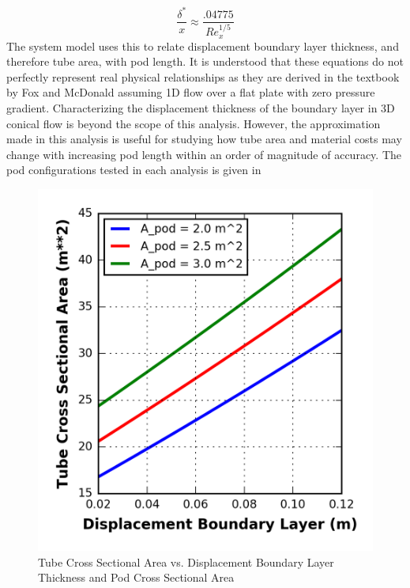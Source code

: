 \begin{equation}
	\label{eq:boundary_layer}
	\frac{\delta^{*}}{x} \approx  \frac{.04775}{Re_{x}^{1/5}}
\end{equation}
The system model uses this to relate displacement boundary layer thickness,
and therefore tube area, with pod length. It is understood that these equations
do not perfectly represent real physical relationships as they are derived in the
textbook by Fox and McDonald assuming 1D flow over a
flat plate with zero pressure gradient. Characterizing the displacement
thickness of the boundary layer in 3D conical flow is beyond the scope of this analysis.
However, the approximation made in this analysis is useful for studying how
tube area and material costs may change with increasing pod length within an
order of magnitude of accuracy.  The pod configurations tested in each analysis is given in
\begin{figure}
	\centering
	\caption{Tube Cross Sectional Area vs. Displacement Boundary Layer Thickness and Pod Cross Sectional Area}
	\label{fig:cross_sec_area_vs_disp_boundary_layer}
	\includegraphics{../../images/graphs/boundary_layer_growth_trades/Tube_Area_vs_boundary_layer.png}
\end{figure}
